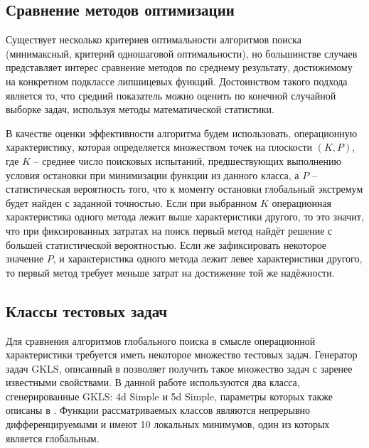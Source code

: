\subsection{Сравнение методов оптимизации} \label{subsec:methods_compasion}
Существует несколько критериев оптимальности алгоритмов поиска (минимаксный, критерий одношаговой оптимальности), но большинстве случаев представляет интерес
сравнение методов по среднему результату, достижимому на конкретном подклассе липшицевых функций. Достоинством такого подхода является то, что средний показатель можно оценить
по конечной случайной выборке задач, используя методы математической статистики.
\par
В качестве оценки эффективности алгоритма будем использовать, операционную характеристику, которая определяется множеством точек на плоскости \((K, P)\),
где \(K\) – среднее число поисковых испытаний, предшествующих выполнению условия остановки при минимизации функции из данного класса, а \(P\) – статистическая вероятность того,
что к моменту остановки глобальный экстремум будет найден с заданной точностью. Если при выбранном \(K\) операционная характеристика одного метода лежит выше характеристики другого,
то это значит, что при фиксированных затратах на поиск первый метод найдёт решение с большей статистической вероятностью. Если же зафиксировать некоторое значение \(P\), и
характеристика одного метода лежит левее характеристики другого, то первый метод требует меньше затрат на достижение той же надёжности.
\subsection{Классы тестовых задач} \label{subsec:test_problems}
Для сравнения алгоритмов глобального поиска в смысле операционной характеристики требуется иметь некоторое множество тестовых задач.
Генератор задач GKLS, описанный в \cite{gklsBook} позволяет получить такое множество задач с заренее известными свойствами.
В данной работе используются два класса, сгенерированные GKLS: 4d Simple и 5d Simple, параметры которых также описаны в \cite{gklsBook}. Функции рассматриваемых классов являются непрерывно
дифференцируемыми и имеют 10 локальных минимумов, один из которых является глобальным.

